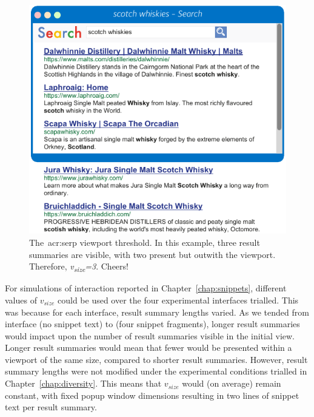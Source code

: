 \begin{figure}
    \begin{center}
    \vspace*{-9mm}
    \includegraphics[width=1\textwidth]{figures/ch6-viewport.pdf}
    \end{center}
    \vspace*{-2mm}
    \caption[Viewport cutoff example]{The~\gls{acr:serp} viewport threshold. In this example, three result summaries are visible, with two present but outwith the viewport. Therefore, \emph{v\textsubscript{size}=3}. Cheers!}
    \label{fig:viewport_cutoff}
\end{figure}

For simulations of interaction reported in Chapter~\ref{chap:snippets}, different values of $v_{size}$ could be used over the four experimental interfaces trialled. This was because for each interface, result summary lengths varied. As we tended from interface  (no snippet text) to  (four snippet fragments), longer result summaries would impact upon the number of result summaries visible in the initial view. Longer result summaries would mean that fewer would be presented within a viewport of the same size, compared to shorter result summaries. However, result summary lengths were not modified under the experimental conditions trialled in Chapter~\ref{chap:diversity}. This means that $v_{size}$ would (on average) remain constant, with fixed popup window dimensions resulting in two lines of snippet text per result summary.

